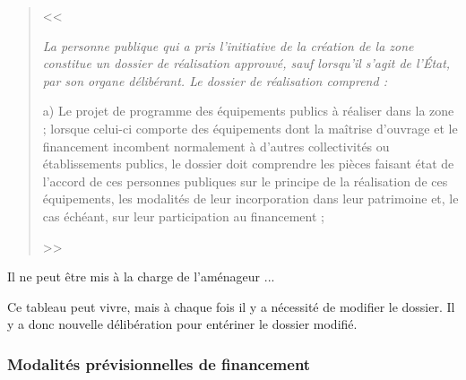 		\begin{quote}
			<< {\itshape La personne publique qui a pris l'initiative de la création de la zone constitue un dossier de réalisation approuvé, sauf lorsqu'il s'agit de l'État, par son organe délibérant. Le dossier de réalisation comprend :

				a) Le projet de programme des équipements publics à réaliser dans la zone ; lorsque celui-ci comporte des équipements dont la maîtrise d'ouvrage et le financement incombent normalement à d'autres collectivités ou établissements publics, le dossier doit comprendre les pièces faisant état de l'accord de ces personnes publiques sur le principe de la réalisation de ces équipements, les modalités de leur incorporation dans leur patrimoine et, le cas échéant, sur leur participation au financement ;

				\lips

%
%
%
			} >>
		\end{quote}

		Il ne peut être mis à la charge de l'aménageur ...

		Ce tableau peut vivre, mais à chaque fois il y a nécessité de modifier le dossier. Il y a donc nouvelle délibération pour entériner le dossier modifié.



		\subsubsection{Modalités prévisionnelles de financement}

